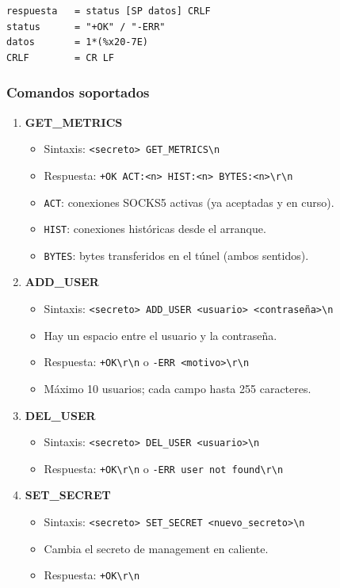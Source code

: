 \documentclass[12pt,a4paper]{article}
\begin{document}
\begin{lstlisting}[caption=Gramática ABNF de respuestas]
respuesta   = status [SP datos] CRLF
status      = "+OK" / "-ERR"
datos       = 1*(%x20-7E)
CRLF        = CR LF
\end{lstlisting}

\subsubsection{Comandos soportados}

\begin{enumerate}
    \item \textbf{GET\_METRICS}
    \begin{itemize}
        \item Sintaxis: \texttt{<secreto> GET\_METRICS\textbackslash n}
        \item Respuesta: \texttt{+OK ACT:<n> HIST:<n> BYTES:<n>\textbackslash r\textbackslash n}
        \item \texttt{ACT}: conexiones SOCKS5 activas (ya aceptadas y en curso).
        \item \texttt{HIST}: conexiones históricas desde el arranque.
        \item \texttt{BYTES}: bytes transferidos en el túnel (ambos sentidos).
    \end{itemize}

    \item \textbf{ADD\_USER}
    \begin{itemize}
        \item Sintaxis: \texttt{<secreto> ADD\_USER <usuario> <contraseña>\textbackslash n}
        \item Hay un espacio entre el usuario y la contraseña.
        \item Respuesta: \texttt{+OK\textbackslash r\textbackslash n} o
              \texttt{-ERR <motivo>\textbackslash r\textbackslash n}
        \item Máximo 10 usuarios; cada campo hasta 255 caracteres.
    \end{itemize}

    \item \textbf{DEL\_USER}
    \begin{itemize}
        \item Sintaxis: \texttt{<secreto> DEL\_USER <usuario>\textbackslash n}
        \item Respuesta: \texttt{+OK\textbackslash r\textbackslash n} o
              \texttt{-ERR user not found\textbackslash r\textbackslash n}
    \end{itemize}

    \item \textbf{SET\_SECRET}
    \begin{itemize}
        \item Sintaxis: \texttt{<secreto> SET\_SECRET <nuevo\_secreto>\textbackslash n}
        \item Cambia el secreto de management en caliente.
        \item Respuesta: \texttt{+OK\textbackslash r\textbackslash n}
    \end{itemize}
\end{enumerate}
\end{document}
